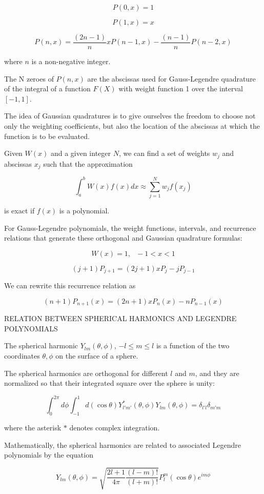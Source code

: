 \documentclass[a4paper, 11pt]{article}
\begin{document}
$$
P(0,x) = 1
$$

$$
P(1,x) = x
$$

$$
P(n,x) = \frac{(2n-1)}{n} x P(n-1, x) - \frac{(n-1)}{n} P(n-2, x)
$$

where $n$ is a non-negative integer. 

The N zeroes of $P(n,x)$ are the abscissas used for Gauss-Legendre quadrature of the integral of a function $F(X)$ with weight function 1 over the interval $[-1,1]$.



The idea of Gaussian quadratures is to give ourselves the freedom to choose not only the weighting coefficients, but also the location of the abscissas at which the function is to be evaluated. 

Given $W(x)$ and a given integer $N$, we can find a set of weights $w_j$ and abscissas $x_j$ such that the approximation 

$$
\int^b_a W(x) f(x) dx \approx \sum^N_{j=1}w_j f(x_j)
$$

is exact if $f(x)$ is a polynomial. 

For Gauss-Legendre polynomials, the weight functions, intervals, and recurrence relations that generate these orthogonal and Gaussian quadrature formulas: 

$$
W(x)=1, \ \ \ -1<x<1
$$

$$
(j+1) P_{j+1} = (2j+1) x P_j - jP_{j-1}
$$

We can rewrite this recurrence relation as 

$$
(n+1)P_{n+1}(x) = (2n+1) x P_{n}(x) - n P_{n-1}(x)
$$

RELATION BETWEEN SPHERICAL HARMONICS AND LEGENDRE POLYNOMIALS

The spherical harmonic $Y_{lm}(\theta, \phi)$, $-l\leq m \leq l$ is a function of the two coordinates $\theta, \phi$ on the surface of a sphere. 

The spherical harmonics are orthogonal for different $l$ and $m$, and they are normalized so that their integrated square over the sphere is unity: 

$$
\int^{2\pi}_{0} d\phi \int^{1}_{-1} d(\cos\theta) Y_{l'm'}^{*}(\theta, \phi) Y_{lm}(\theta, \phi) = \delta_{l'l}\delta_{m'm}
$$

where the asterisk $*$ denotes complex integration. 

Mathematically, the spherical harmonics are related to associated Legendre polynomials by the equation

$$
Y_{lm}(\theta, \phi) = \sqrt{\frac{2l+1}{4\pi}\frac{(l-m)!}{(l+m)!}}P^m_l(\cos\theta) e^{i m \phi}
$$
\end{document}
